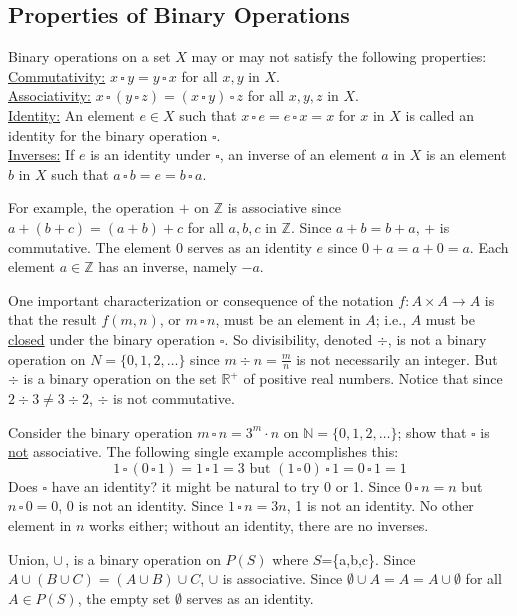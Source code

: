 \documentclass[12pt]{book}
\theoremstyle{definition}
\begin{document}
\subsection{Properties of Binary Operations}

Binary operations on a set $X$ may or may not satisfy the following properties:\\
\underline{Commutativity:} $x\,\square\, y =y\,\square\, x$ for all $x,y$ in $X$.\\
\underline{Associativity:} $x\,\square\,(y\,\square\, z)=(x\,\square\, y)\,\square\, z$ for all $x,y,z$ in $X$.\\
\underline{Identity:} An element $e\in X$ such that $x\,\square\, e=e\,\square\, x = x$ for $x$ in $X$ is called an identity for the binary operation $\square$.\\
\underline{Inverses:} If $e$ is an identity under $\square$, an inverse of an element $a$ in $X$ is an element $b$ in $X$ such that $a\,\square\, b=e=b\,\square\, a$.

For example, the operation $+$ on $\mathbb{Z}$ is associative since $a+(b+c)=(a+b)+c$ for all $a,b,c$ in $\mathbb{Z}$.  Since $a+b=b+a$, + is commutative.  The element 0 serves as an identity $e$ since $0+a=a+0=a$.  Each element $a\in \mathbb{Z}$ has an inverse, namely $-a$.

One important characterization or consequence of the notation $f:A\times A\rightarrow A$ is that the result $f(m,n)$, or $m\,\square\, n$, must be an element in $A$; i.e., $A$ must be \underline {closed} under the binary operation $\square$.  So divisibility, denoted $\div$, is not a binary operation on $N=\{0,1,2,\dots\}$ since $m\div n = \frac m n$ is not necessarily an integer.  But $\div$ is a binary operation on the set $\mathbb{R}^+$ of positive real numbers.  Notice that since $2\div3\neq3\div2$, $\div$ is not commutative.
\newpage
\begin{tcexample}{}{} 
Consider the binary operation $m\,\square\, n=3^m\cdot n$ on $\mathbb{N}=\{0,1,2,\dots\}$; show that $\square$ is \underline{not} associative.  The following single example accomplishes this:
$$1\,\square\,(0\,\square\, 1) = 1\,\square\, 1 = 3\text{ but }(1\,\square\, 0)\,\square\, 1 = 0\,\square\, 1 = 1$$
Does $\square$ have an identity?  it might be natural to try 0 or 1.  Since $0\,\square\, n = n$ but $n\,\square\, 0=0$, 0 is not an identity.  Since $1\,\square\, n = 3n$, 1 is not an identity.  No other element in $n$ works either;  without an identity, there are no inverses.
\end{tcexample}
\addtolength{\partopsep}{-.5in}
\begin{tcexample}{}{}
Union, $\cup\,$, is a binary operation on $P(S)$ where $S$=\{a,b,c\}.  Since $A\cup(B\cup C)=(A\cup B)\cup C$, $\cup$ is associative.   Since $\emptyset \cup A=A=A\cup\emptyset$ for all $A\in P(S)$, the empty set $\emptyset$ serves as an identity.
\end{tcexample}
\end{document}
